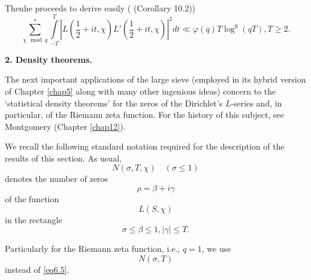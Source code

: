 Then\pageoriginale he proceeds to derive easily (\cite{key5}
(Corollary 10.2)) 
\begin{equation*}
\sum_{\chi \mod q}^* \int\limits_{-T}^{T} | L(\frac{1}{2} + it,\chi )
L' (\frac{1}{2} + it, \chi ) |^2 dt \ll \varphi (q) T \log^6 (qT), T
\geq 2. \tag{6.4}\label{eq6.4} 
\end{equation*}


\medskip
\noindent
{\bf 2. Density theorems.}
\smallskip

The next important applications of the large sieve (employed in its
hybrid version of Chapter \ref{chap5} along with many other ingenious ideas)
concern to the `statistical density theorems' for the zeros of the
Dirichlet's $L$-series and, in particular, of the Riemann zeta
function. For the history of this subject, see Montgomery \cite{key5}
(Chapter \ref{chap12}). 

We recall the following standard notation required for the description
of the results of this section. As usual, 
\begin{equation*}
N(\sigma ,T,\chi ) \quad (\sigma \leq 1) \tag{6.5}\label{eq6.5}
\end{equation*}
denotes the number of zeros
\begin{equation*}
\rho = \beta + i \gamma \tag{6.6}\label{eq6.6}
\end{equation*}
of the function
\begin{equation*}
L(S,\chi ) \tag{6.7}\label{eq6.7}
\end{equation*}
in the rectangle
\begin{equation*}
\sigma \leq \beta \leq 1, | \gamma | \leq T. \tag{6.8}\label{eq6.8}
\end{equation*}

Particularly for the Riemann zeta function, i.e., $q = 1$, we use
\begin{equation*}
N(\sigma , T) \tag{6.9}\label{eq6.9}
\end{equation*}
instead of \eqref{eq6.5}.

